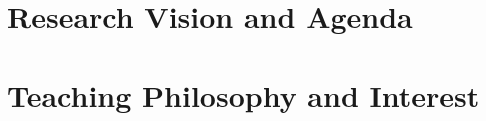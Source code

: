 \author{Yuyang Wang}
\date{\vspace{-7ex}}
\makeatletter
\fancyfoot[L]{\scshape \MakeLowercase{\@author}}
\fancyfoot[R]{{\scshape \MakeLowercase{\@title}}\quad{\LARGE\sfrac{\thepage}{\pageref*{LastPage}}}}
\makeatother



\maketitle%
\thispagestyle{fancy}

\part{Research Vision and Agenda}



{\scriptsize
    
}

\part{Teaching Philosophy and Interest}



